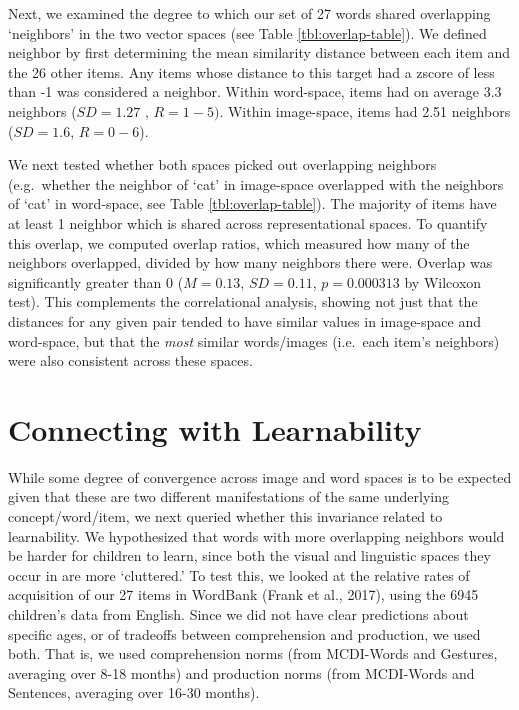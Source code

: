 \documentclass[10pt, letterpaper]{article}
\begin{document}
Next, we examined the degree to which our set of 27 words shared
overlapping `neighbors' in the two vector spaces (see Table
\ref{tbl:overlap-table}). We defined neighbor by first determining the
mean similarity distance between each item and the 26 other items. Any
items whose distance to this target had a zscore of less than -1 was
considered a neighbor. Within word-space, items had on average 3.3
neighbors (\(SD=1.27\) , \(R=1-5)\). Within image-space, items had 2.51
neighbors (\(SD=1.6\), \(R=0-6\)).

We next tested whether both spaces picked out overlapping neighbors
(e.g.~whether the neighbor of `cat' in image-space overlapped with the
neighbors of `cat' in word-space, see Table \ref{tbl:overlap-table}).
The majority of items have at least 1 neighbor which is shared across
representational spaces. To quantify this overlap, we computed overlap
ratios, which measured how many of the neighbors overlapped, divided by
how many neighbors there were. Overlap was significantly greater than 0
(\(M=0.13\), \(SD=0.11\), \(p=0.000313\) by Wilcoxon test). This
complements the correlational analysis, showing not just that the
distances for any given pair tended to have similar values in
image-space and word-space, but that the \emph{most} similar
words/images (i.e.~each item's neighbors) were also consistent across
these spaces.

\section{Connecting with
Learnability}\label{connecting-with-learnability}

While some degree of convergence across image and word spaces is to be
expected given that these are two different manifestations of the same
underlying concept/word/item, we next queried whether this invariance
related to learnability. We hypothesized that words with more
overlapping neighbors would be harder for children to learn, since both
the visual and linguistic spaces they occur in are more `cluttered.' To
test this, we looked at the relative rates of acquisition of our 27
items in WordBank (Frank et al., 2017), using the 6945 children's data
from English. Since we did not have clear predictions about specific
ages, or of tradeoffs between comprehension and production, we used
both. That is, we used comprehension norms (from MCDI-Words and
Gestures, averaging over 8-18 months) and production norms (from
MCDI-Words and Sentences, averaging over 16-30 months).
\end{document}
